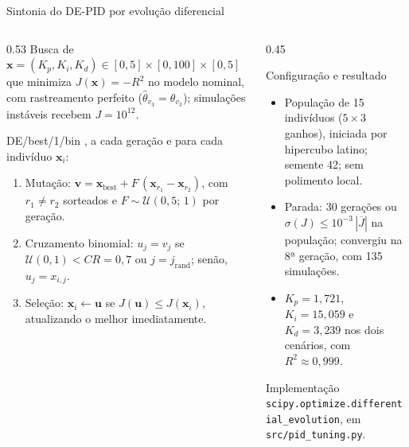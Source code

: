 \begin{frame}{Sintonia do DE-PID por evolução diferencial}
  \begin{columns}[T]
    \begin{column}{0.53\textwidth}
      \footnotesize
      Busca de $\mathbf{x} = (K_p, K_i, K_d) \in [0, 5] \times [0, 100] \times [0, 5]$ que minimiza $J(\mathbf{x}) = -R^2$ no modelo nominal, com rastreamento perfeito ($\hat{\theta}_{v_3} = \theta_{v_3}$); simulações instáveis recebem $J = 10^{12}$.

      \vspace{0.15cm}
      DE/best/1/bin \cite{Storn:1997}, a cada geração e para cada indivíduo $\mathbf{x}_i$:
      \begin{enumerate}
        \setlength{\itemsep}{0.08cm}
        \item \alert{Mutação}: $\mathbf{v} = \mathbf{x}_{\text{best}} + F\,(\mathbf{x}_{r_1} - \mathbf{x}_{r_2})$, com $r_1 \neq r_2$ sorteados e $F \sim \mathcal{U}(0{,}5;\, 1)$ por geração.
        \item \alert{Cruzamento binomial}: $u_j = v_j$ se $\mathcal{U}(0, 1) < CR = 0{,}7$ ou $j = j_{\text{rand}}$; senão, $u_j = x_{i,j}$.
        \item \alert{Seleção}: $\mathbf{x}_i \leftarrow \mathbf{u}$ se $J(\mathbf{u}) \leq J(\mathbf{x}_i)$, atualizando o melhor imediatamente.
      \end{enumerate}
    \end{column}
    \begin{column}{0.45\textwidth}
      \begin{block}{Configuração e resultado}
        \footnotesize
        \begin{itemize}
          \item População de 15 indivíduos ($5 \times 3$ ganhos), iniciada por hipercubo latino; semente 42; sem polimento local.
          \item Parada: 30 gerações ou $\sigma(J) \leq 10^{-3}\,|\overline{J}|$ na população; convergiu na 8ª geração, com 135 simulações.
          \item $K_p = 1{,}721$, $K_i = 15{,}059$ e $K_d = 3{,}239$ nos dois cenários, com $R^2 \approx 0{,}999$.
        \end{itemize}
      \end{block}
      \vspace{0.1cm}
      \begin{exampleblock}{Implementação}
        \footnotesize 
        \texttt{scipy.optimize.differential\_evolution}, em \texttt{src/pid\_tuning.py}.
      \end{exampleblock}
    \end{column}
  \end{columns}
\end{frame}

